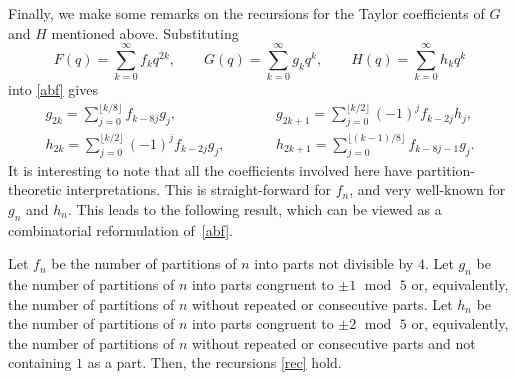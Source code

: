Finally, we make some remarks on the
 recursions for the Taylor coefficients of $G$ and $H$ mentioned above.
Substituting
\begin{equation*}F(q)=\sum_{k=0}^\infty f_kq^{2k},\qquad G(q)=\sum_{k=0}^\infty g_kq^k,\qquad H(q)=\sum_{k=0}^\infty h_kq^k\end{equation*}
into \eqref{abf} gives
\begin{subequations}\label{rec}
\begin{alignat}{3}%
& g_{2k}=\sum_{j=0}^{\lfloor k/8\rfloor}f_{k-8j}g_j,\qquad&&
g_{2k+1}=\sum_{j=0}^{\lfloor k/2\rfloor}(-1)^jf_{k-2j}h_j,&\\
& h_{2k}=\sum_{j=0}^{\lfloor k/2\rfloor}(-1)^jf_{k-2j}g_j,\qquad&&
h_{2k+1}=\sum_{j=0}^{\lfloor (k-1)/8\rfloor}f_{k-8j-1}g_j.&
\end{alignat}
\end{subequations}
It is interesting to note that all the coefficients involved here have partition-theoretic interpretations. This is straight-forward for $f_n$, and very well-known for $g_n$ and $h_n$.
This leads to the following result, which can be viewed as a combinatorial reformulation of~\eqref{abf}.

\begin{Corollary}
Let $f_n$ be the number of partitions of $n$ into parts not divisible by $4$.
Let $g_n$ be the number of partitions of $n$ into parts congruent to $\pm 1$ $\operatorname{mod}$ $5$ or, equivalently, the number of partitions
of $n$ without repeated or consecutive parts. Let $h_n$ be
the number of partitions of $n$ into parts congruent to $\pm 2$ $\operatorname{mod}$ $5$ or, equivalently, the number of partitions
of $n$ without repeated or consecutive parts and not containing $1$ as a part. Then, the recursions \eqref{rec} hold.
\end{Corollary}

